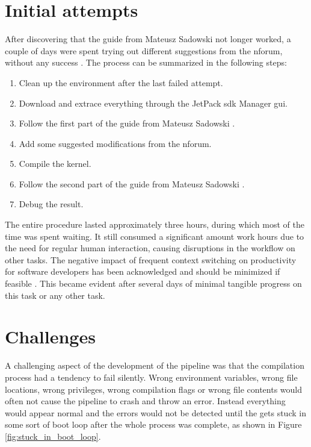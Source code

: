 \section{Initial attempts}
After discovering that the guide from Mateusz Sadowski not longer worked, a couple of days were spent trying out different suggestions from the \gls{nforum}, without any success \cite{martensPortableSensorRig2022}.
The process can be summarized in the following steps:
\begin{enumerate}
    \item Clean up the environment after the last failed attempt.
    \item Download and extrace everything through the JetPack \gls{sdk} Manager gui.
    \item Follow the first part of the guide from Mateusz Sadowski \cite{sadowskiEnablingPPSJetson2020}.
    \item Add some suggested modifications from the \gls{nforum}.
    \item Compile the kernel.
    \item Follow the second part of the guide from Mateusz Sadowski \cite{sadowskiEnablingPPSJetson2020}.
    \item Debug the result.
\end{enumerate}
The entire procedure lasted approximately three hours, during which most of the time was spent waiting.
It still consumed a significant amount work hours due to the need for regular human interaction, causing disruptions in the workflow on other tasks.
The negative impact of frequent context switching on productivity for software developers has been acknowledged and should be minimized if feasible \cite{meyerSoftwareDevelopersPerceptions2014}.
This became evident after several days of minimal tangible progress on this task or any other task.

\section{Challenges}
A challenging aspect of the development of the pipeline was that the compilation process had a tendency to fail silently.
Wrong environment variables, wrong file locations, wrong privileges, wrong compilation flags or wrong file contents would often not cause the pipeline to crash and throw an error.
Instead everything would appear normal and the errors would not be detected until the \jx gets stuck in some sort of boot loop after the whole process was complete, as shown in Figure \ref{fig:stuck_in_boot_loop}.

